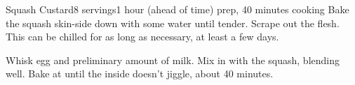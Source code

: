 \documentclass[../Cookbook.tex]{subfiles}
\begin{document}
\begin{recipe}[SquashCustard]{Squash Custard}{8 servings}{1 hour (ahead of time) prep, 40 minutes cooking}
	Bake the squash skin-side down with some water until tender.
	Scrape out the flesh. This can be chilled for as long as necessary, at least a few days.

	Whisk egg and preliminary amount of milk.
	Mix in with the squash, blending well.
	Bake at  until the inside doesn't jiggle, about 40%
	minutes.
\end{recipe}
\end{document}

